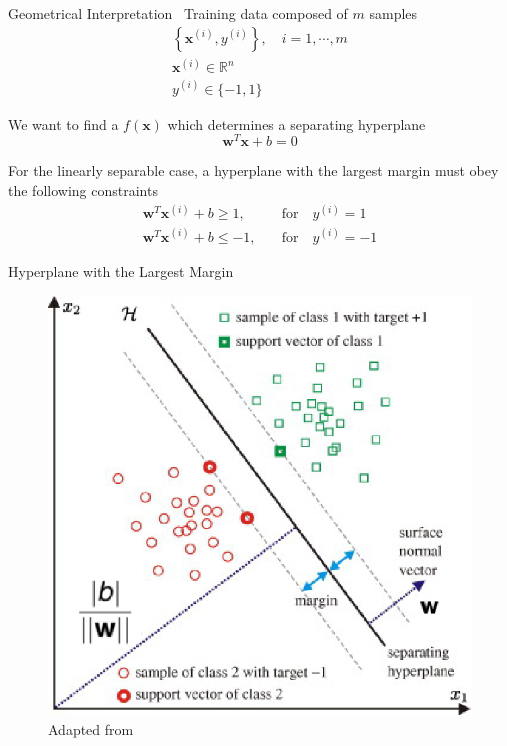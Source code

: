 \documentclass{beamer}
\begin{document}
\begin{frame}{Geometrical Interpretation~\cite{Burges1998}}
    Training data composed of $m$ samples
    $$
    \begin{array}{l}
        \left\{\mathbf{x}^{(i)}, y^{(i)}\right\}, \quad i = 1, \cdots, m\\[.2cm]
        \mathbf{x}^{(i)} \in \mathbb{R}^n\\[.2cm]
        y^{(i)} \in \{-1, 1\}
    \end{array}
    $$

    We want to find a $f(\mathbf{x})$ which determines a separating hyperplane
    \begin{equation}
        \mathbf{w}^T \mathbf{x} + b = 0
        \label{eq:f_hyperplane}
    \end{equation}

    For the linearly separable case, a hyperplane with the largest margin must obey the
    following constraints
    \begin{equation}
        \begin{array}{ll}
            \mathbf{w}^T \mathbf{x}^{(i)} + b \ge 1, & \quad \mbox{for} \quad y^{(i)} =
            1\\[.2cm]
            \mathbf{w}^T \mathbf{x}^{(i)} + b \le -1, & \quad \mbox{for} \quad y^{(i)} = -1
        \end{array}
        \label{eq:orig_constraints}
    \end{equation}
\end{frame}

\begin{frame}{Hyperplane with the Largest Margin}
    \begin{figure}[!htb]
        \centering
        \includegraphics[width=.6\textwidth]{figures/svm_hyperplane2.eps}
        \caption{Adapted from \cite{Fisch20103381}}
    \end{figure}
\end{frame}
\end{document}
